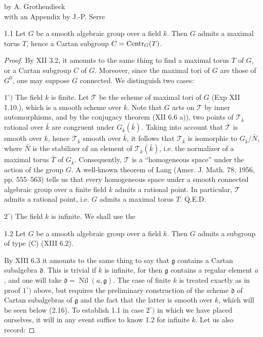 \label{XIV}
\begin{center}by A. Grothendieck\\with an Appendix by J.-P. Serre\end{center}
{\renewcommand{\thefootnote}{0}}
\setcounter{footnote}{0}

\begin{theorem}{1.1}\label{XIV.1.1}
Let $G$ be a smooth algebraic group over a field $k$. Then $G$ admits a
maximal torus $T$, hence a Cartan subgroup $C=\operatorname{Centr}_G(T)$.
\end{theorem}
\begin{proof}
By XII 3.2, it amounts to the same thing to find a maximal torus $T$ of
$G$, or a Cartan subgroup $C$ of $G$. Moreover, since the maximal tori
of $G$ are those of $G^0$, one may suppose $G$ connected. We distinguish
two cases:

\noindent $1^\circ)$ The field $k$ is finite. Let $\mathcal T$ be the
scheme of maximal tori of $G$ (Exp XII 1.10.), which is a smooth scheme
over $k$. Note that $G$ acts on $\mathcal T$ by inner automorphisms,
and by the conjugacy theorem (XII 6.6 a)), two points of
$\mathcal T_{\bar k}$ rational over $\bar k$ are congruent under
$G_{\bar k}(\bar k)$. Taking into account that $\mathcal T$ is smooth
over $k$, hence $\mathcal T_{\bar k}$ smooth over $\bar k$, it follows
that $\mathcal T_{\bar k}$ is isomorphic to $G_{\bar k}/\bar N$, where
$\bar N$ is the stabilizer of an element of $\mathcal T_{\bar k}(\bar k)$,
i.e. the normalizer of a maximal torus $\bar T$ of $G_{\bar k}$.
Consequently, $\mathcal T$ is a ``homogeneous space'' under the action
of the group $G$. A well-known theorem of Lang (Amer. J. Math. 78,
1956, pp. 555--563) tells us that every homogeneous space under a
smooth connected algebraic group over a finite field $k$ admits a
rational point. In particular, $\mathcal T$ admits a rational point,
i.e. $G$ admits a maximal torus $T$. \hfill Q.E.D.

\noindent $2^\circ)$ The field $k$ is infinite. We shall use the
\begin{lemma}{1.2}\label{XIV.1.2}
Let $G$ be a smooth algebraic group over a field $k$. Then $G$ admits
a subgroup of type (C) (XIII 6.2).
\end{lemma}
By XIII 6.3 it amounts to the same thing to say that $\mathfrak g$
contains a Cartan subalgebra $\mathfrak d$. This is trivial if $k$ is
infinite, for then $\mathfrak g$ contains a regular element $a$, and
one will take $\mathfrak d=\operatorname{Nil}(a,\mathfrak g)$. The
case of finite $k$ is treated exactly as in proof $1^\circ)$ above,
but requires the preliminary construction of the scheme $\mathfrak d$
of Cartan subalgebras of $\mathfrak g$ and the fact that the latter
is smooth over $k$, which will be seen below (2.16). To establish
1.1 in case $2^\circ)$ in which we have placed ourselves, it will in
any event suffice to know 1.2 for infinite $k$. Let us also record:


\end{proof}

